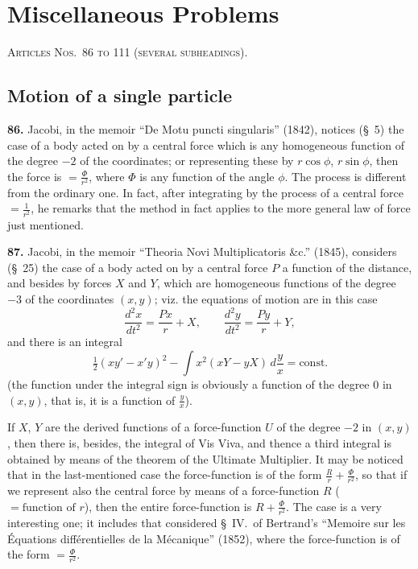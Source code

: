 \documentclass[11pt,a4paper]{article}
\theoremstyle{definition}
\begin{document}
\section*{Miscellaneous Problems}
\noindent\textsc{Articles Nos.~86 to 111 (several subheadings).}

\subsection*{Motion of a single particle}

\textbf{86.} Jacobi, in the memoir ``De Motu puncti singularis'' (1842), notices (\S~5) the case of a body acted on by a central force which is any homogeneous function of the degree $-2$ of the coordinates; or representing these by $r\cos\phi$, $r\sin\phi$, then the force is $= \frac{\Phi}{r^2}$, where $\Phi$ is any function of the angle $\phi$. The process is different from the ordinary one. In fact, after integrating by the process of a central force $= \frac{1}{r^2}$, he remarks that the method in fact applies to the more general law of force just mentioned.

\textbf{87.} Jacobi, in the memoir ``Theoria Novi Multiplicatoris \&c.'' (1845), considers (\S~25) the case of a body acted on by a central force $P$ a function of the distance, and besides by forces $X$ and $Y$, which are homogeneous functions of the degree $-3$ of the coordinates $(x, y)$; viz. the equations of motion are in this case
\[
\frac{d^2x}{dt^2} = \frac{Px}{r} + X, \qquad \frac{d^2y}{dt^2} = \frac{Py}{r} + Y,
\]
and there is an integral
\[
\tfrac{1}{2}(xy' - x'y)^2 - \int x^2(xY - yX)\,d\frac{y}{x} = \text{const.}
\]
(the function under the integral sign is obviously a function of the degree 0 in $(x, y)$, that is, it is a function of $\frac{y}{x}$).

If $X$, $Y$ are the derived functions of a force-function $U$ of the degree $-2$ in $(x, y)$, then there is, besides, the integral of Vis Viva, and thence a third integral is obtained by means of the theorem of the Ultimate Multiplier. It may be noticed that in the last-mentioned case the force-function is of the form $\frac{R}{r} + \frac{\Phi}{r^2}$, so that if we represent also the central force by means of a force-function $R$ ($= \text{function of } r$), then the entire force-function is $R + \frac{\Phi}{r^2}$. The case is a very interesting one; it includes that considered \S~IV.\ of Bertrand's ``Memoire sur les \'Equations diff\'erentielles de la M\'ecanique'' (1852), where the force-function is of the form $= \frac{\Phi}{r^2}$.
\end{document}
